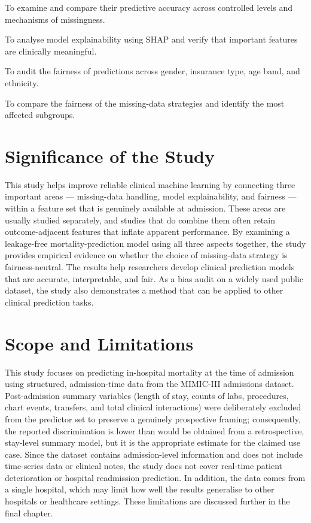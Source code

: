 \documentclass[12pt,a4paper]{report}
\begin{document}
To examine and compare their predictive accuracy across controlled levels and mechanisms of missingness.

To analyse model explainability using SHAP and verify that important features are clinically meaningful.

To audit the fairness of predictions across gender, insurance type, age band, and ethnicity.

To compare the fairness of the missing-data strategies and identify the most affected subgroups.


\section{Significance of the Study}
This study helps improve reliable clinical machine learning by connecting three important areas --- missing-data handling, model explainability, and fairness --- within a feature set that is genuinely available at admission. These areas are usually studied separately, and studies that do combine them often retain outcome-adjacent features that inflate apparent performance. By examining a leakage-free mortality-prediction model using all three aspects together, the study provides empirical evidence on whether the choice of missing-data strategy is fairness-neutral. The results help researchers develop clinical prediction models that are accurate, interpretable, and fair. As a bias audit on a widely used public dataset, the study also demonstrates a method that can be applied to other clinical prediction tasks.


\section{Scope and Limitations}
This study focuses on predicting in-hospital mortality at the time of admission using structured, admission-time data from the MIMIC-III admissions dataset. Post-admission summary variables (length of stay, counts of labs, procedures, chart events, transfers, and total clinical interactions) were deliberately excluded from the predictor set to preserve a genuinely prospective framing; consequently, the reported discrimination is lower than would be obtained from a retrospective, stay-level summary model, but it is the appropriate estimate for the claimed use case. Since the dataset contains admission-level information and does not include time-series data or clinical notes, the study does not cover real-time patient deterioration or hospital readmission prediction. In addition, the data comes from a single hospital, which may limit how well the results generalise to other hospitals or healthcare settings. These limitations are discussed further in the final chapter.
\end{document}
